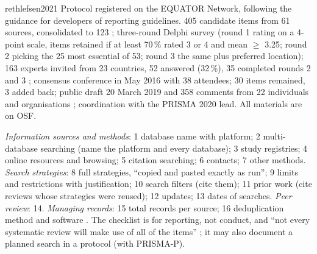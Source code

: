 \begin{papercard}{rethlefsen2021}
 Protocol registered on the EQUATOR Network, following the guidance for developers of reporting guidelines. 405 candidate items from 61 sources, consolidated to 123 ; three-round Delphi survey (round 1 rating on a 4-point scale, items retained if at least 70\,\% rated 3 or 4 and mean $\geq$ 3.25; round 2 picking the 25 most essential of 53; round 3 the same plus preferred location); 163 experts invited from 23 countries, 52 answered (32\,\%), 35 completed rounds 2 and 3 ; consensus conference in May 2016 with 38 attendees; 30 items remained, 3 added back; public draft 20 March 2019 and 358 comments from 22 individuals and organisations ; coordination with the PRISMA 2020 lead. All materials are on OSF.

 \emph{Information sources and methods}: 1 database name with platform; 2 multi-database searching (name the platform and every database); 3 study registries; 4 online resources and browsing; 5 citation searching; 6 contacts; 7 other methods. \emph{Search strategies}: 8 full strategies, ``copied and pasted exactly as run''; 9 limits and restrictions with justification; 10 search filters (cite them); 11 prior work (cite reviews whose strategies were reused); 12 updates; 13 dates of searches. \emph{Peer review}: 14. \emph{Managing records}: 15 total records per source; 16 deduplication method and software . The checklist is for reporting, not conduct, and ``not every systematic review will make use of all of the items'' ; it may also document a planned search in a protocol (with PRISMA-P).


\end{papercard}
